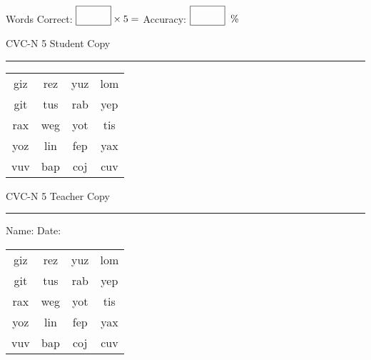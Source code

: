 \documentclass{memoir}
\begin{document}
\small

Words Correct: $\fbox{\phantom{\huge 100}} \times 5 = $ Accuracy: $\fbox{\phantom{\huge 100}}\;\; \%$ 

\vfill

\newpage


\footnotesize \noindent
CVC-N 5 \hfill Student Copy
\smallskip
\hrule

\Large

\setlength{\tabcolsep}{14pt}
\def\arraystretch{2}

{\selectfont


\begin{vplace}[0.5]
\begin{center}
\begin{tabular}{cccc}
giz & rez & yuz & lom \\
git & tus & rab & yep \\
rax & weg & yot & tis \\
yoz & lin & fep & yax \\
vuv & bap & coj & cuv \\
\end{tabular}
\end{center}
\end{vplace}

}

\newpage

\footnotesize \noindent
CVC-N 5 \hfill Teacher Copy
\smallskip
\hrule

\small

\vfill

\noindent
Name: \underline{\hspace{1.75in}} \hfill Date: \underline{\hspace{1in}}

\Large

{\selectfont


\begin{vplace}[0.5]
\begin{center}
\begin{tabular}{cccc}
giz & rez & yuz & lom \\
git & tus & rab & yep \\
rax & weg & yot & tis \\
yoz & lin & fep & yax \\
vuv & bap & coj & cuv \\
\end{tabular}
\end{center}
\end{vplace}



}
\end{document}
